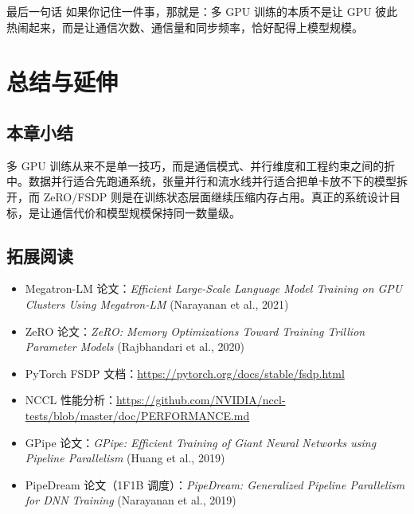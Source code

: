 \documentclass[a4paper]{article}
\begin{document}
\begin{knowledgebox}{最后一句话}
如果你记住一件事，那就是：多 GPU 训练的本质不是让 GPU 彼此热闹起来，而是让通信次数、通信量和同步频率，恰好配得上模型规模。
\end{knowledgebox}

\section{总结与延伸}

\subsection{本章小结}
多 GPU 训练从来不是单一技巧，而是通信模式、并行维度和工程约束之间的折中。数据并行适合先跑通系统，张量并行和流水线并行适合把单卡放不下的模型拆开，而 ZeRO/FSDP 则是在训练状态层面继续压缩内存占用。真正的系统设计目标，是让通信代价和模型规模保持同一数量级。

\subsection{拓展阅读}

\begin{itemize}
    \item Megatron-LM 论文：\textit{Efficient Large-Scale Language Model Training on GPU Clusters Using Megatron-LM} (Narayanan et al., 2021)
    \item ZeRO 论文：\textit{ZeRO: Memory Optimizations Toward Training Trillion Parameter Models} (Rajbhandari et al., 2020)
    \item PyTorch FSDP 文档：\url{https://pytorch.org/docs/stable/fsdp.html}
    \item NCCL 性能分析：\url{https://github.com/NVIDIA/nccl-tests/blob/master/doc/PERFORMANCE.md}
    \item GPipe 论文：\textit{GPipe: Efficient Training of Giant Neural Networks using Pipeline Parallelism} (Huang et al., 2019)
    \item PipeDream 论文（1F1B 调度）：\textit{PipeDream: Generalized Pipeline Parallelism for DNN Training} (Narayanan et al., 2019)
\end{itemize}
\end{document}
